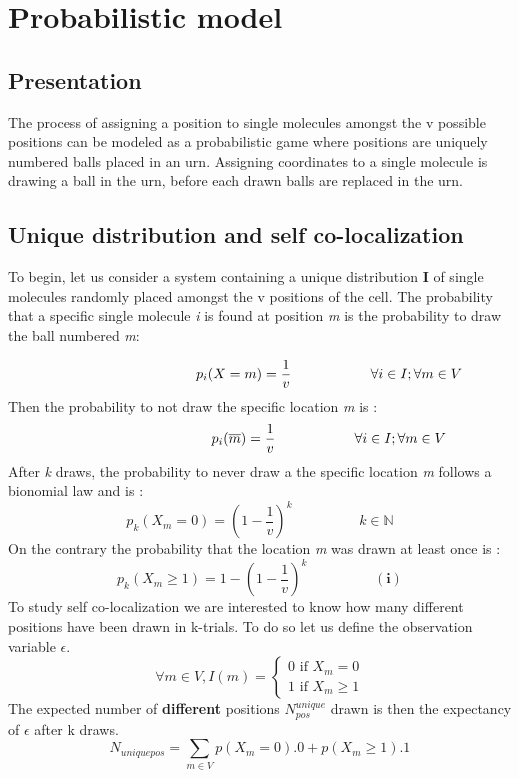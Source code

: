 \documentclass{article}  %
\begin{document}
\section{Probabilistic model}

\subsection{Presentation}
The process of assigning a position to single molecules amongst the v possible positions can be modeled as a probabilistic game where
positions are uniquely numbered balls placed in an urn. Assigning coordinates to a single molecule is drawing a ball in the urn,
before each drawn balls are replaced in the urn.

\subsection{Unique distribution and self co-localization}
To begin, let us consider a system containing a unique distribution \textbf{I} of single molecules randomly placed amongst the v positions of the cell.
The probability that a specific single molecule \textit{i} is found at position \textit{m} is the probability to draw the ball numbered
\textit{m}:

\[
    \hspace{3.5cm} p_i(X=m) = \frac{1}{v} \hspace{2cm} \forall  i \in I; \forall m \in V
\]
Then the probability to not draw the specific location \textit{m} is :
\[
    \hspace{3.5cm} p_i(\overline{m}) = \frac{1}{v} \hspace{2cm} \forall  i \in I; \forall m \in V
\]
After \textit{k} draws, the probability to never draw a the specific location \textit{m} follows a bionomial law and is :
\[
p_k(X_m = 0) = (1 - \frac{1}{v})^k \hspace{2cm} k \in \mathbb{N}
\]
On the contrary the probability that the location \textit{m} was drawn at least once is :
\[
p_k(X_m \geq 1) = 1-(1 - \frac{1}{v})^k \hspace{2cm} (\textbf{i})
\]
To study self co-localization we are interested to know how many different positions have been drawn in k-trials. To do so let us 
define the observation variable $ \epsilon $.
\[
\forall m \in V, I(m) = \begin{cases}
    0 \text{ if } X_m = 0 \\
    1 \text{ if } X_m \geq 1
\end{cases}
\]
The expected number of \textbf{different} positions $ N^{unique}_{pos} $ drawn is then the expectancy of $ \epsilon $ after k draws.
\[
    N_{uniquepos} = \sum_{m \in V}p(X_m = 0).0 + p(X_m \geq 1).1
\]
\end{document}
